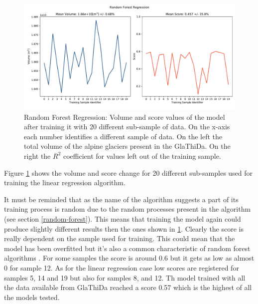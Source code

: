 \begin{figure}[!tp]
	\centering		  
	\includegraphics[width=1.\textwidth]{figures/RFR_score.pdf}
	\caption{Random Forest Regression: Volume and score values of the model after training it with 20 different sub-sample of data. On the x-axis each number identifies a different sample of data. On the left the total volume of the alpine glaciers present in the GlaThiDa. On the right the $R^2$ coefficient for values left out of the training sample.}
	\label{fig:rfr-score}
\end{figure}

Figure \ref{fig:rfr-score} shows the volume and score change for 20 different sub-samples used for training the linear regression algorithm. 

It must be reminded that as the name of the algorithm suggests a part of its training process is random due to the random processes present in the algorithm (see section \ref{random-forest}). This means that training the model again could produce slightly different results then the ones shown in \ref{fig:rfr-score}.
Clearly the score is really dependent on the sample used for training. This could mean that the model has been overfitted but it's also a common characteristic of random forest algorithms \cite{RandomForest2018}. For some samples the score is around 0.6 but it gets as low as almost 0 for sample 12. As for the linear regression case low scores are registered for samples 5, 14 and 19 but also for samples 8, and 12. 
Th model trained with all the data available from GlaThiDa reached a score 0.57 which is the highest of all the models tested.


